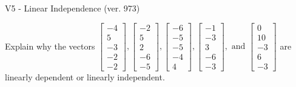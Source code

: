 \begin{exercise}
  \begin{exerciseTitle}V5 - Linear Independence (ver. 973)\end{exerciseTitle}
  \begin{exerciseStatement}
    Explain why the vectors \(\left[\begin{array}{r}
-4 \\
5 \\
-3 \\
-2 \\
-2
\end{array}\right] , \left[\begin{array}{r}
-2 \\
5 \\
2 \\
-6 \\
-5
\end{array}\right] , \left[\begin{array}{r}
-6 \\
-5 \\
-5 \\
-4 \\
4
\end{array}\right] , \left[\begin{array}{r}
-1 \\
-3 \\
3 \\
-6 \\
-3
\end{array}\right] , \text{ and } \left[\begin{array}{r}
0 \\
10 \\
-3 \\
6 \\
-3
\end{array}\right]\) are linearly dependent or linearly independent.	



\end{exerciseStatement}
\end{exercise}
